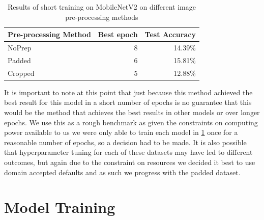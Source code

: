 \documentclass[12pt]{article}
\numberwithin{equation}{section}
\numberwithin{figure}{section}
\begin{document}
\begin{table}[]
	\centering
	\begin{tabular}{|l|r|r|}
	\hline
	\textbf{Pre-processing Method} & \multicolumn{1}{l|}{\textbf{Best epoch}} & \multicolumn{1}{l|}{\textbf{Test Accuracy}} \\ \hline
	NoPrep                         & 8                                        & 14.39\%                                     \\ \hline
	Padded                         & 6                                        & 15.81\%                                     \\ \hline
	Cropped                        & 5                                        & 12.88\%                                     \\ \hline
	\end{tabular}
	\caption{Results of short training on MobileNetV2 on different image pre-processing methods}
	\label{tab:preprocres}
\end{table}

It is important to note at this point that just because this method achieved the best result for this model in a short number of epochs is no guarantee that this would be the method that achieves the best results in other models or over longer epochs. We use this as a rough benchmark as given the constraints on computing power available to us we were only able to train each model in \cref{sec:Model_Training} once for a reasonable number of epochs, so a decision had to be made. It is also possible that hyperparameter tuning for each of these datasets may have led to different outcomes, but again due to the constraint on resources we decided it best to use domain accepted defaults and as such we progress with the padded dataset.

\section{Model Training} 
\label{sec:Model_Training} 
\end{document}
